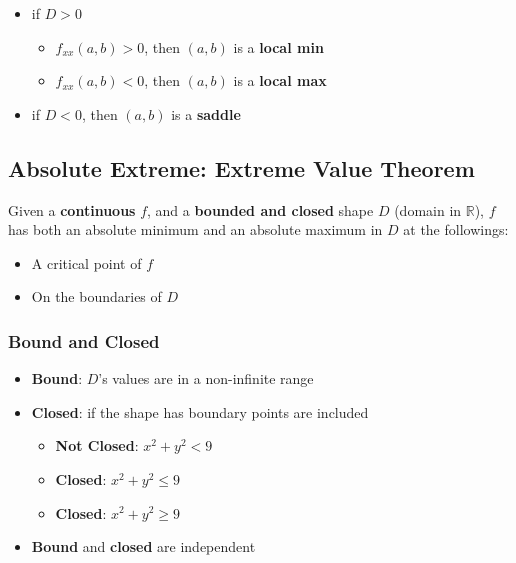    \begin{itemize}
      \item if $ D > 0 $
      \begin{itemize}
        \item $ f_{xx} (a, b) > 0 $, then $ (a, b) $ is a \textbf{local min}
        \item $ f_{xx} (a, b) < 0 $, then $ (a, b) $ is a \textbf{local max}
      \end{itemize}

      \item if $ D < 0 $, then $ (a, b) $ is a \textbf{saddle}
    \end{itemize}

  \subsection{Absolute Extreme: Extreme Value Theorem}

    Given a \textbf{continuous} $ f $, and a \textbf{bounded and closed}
    shape $ D $ (domain in $ \mathbb{R} $), $ f $ has both an absolute minimum
    and an absolute maximum in $ D $ at the followings:
    \begin{itemize}
      \item A critical point of $ f $
      \item On the boundaries of $ D $
    \end{itemize}

    \subsubsection{Bound and Closed}

      \begin{itemize}
        \item \textbf{Bound}: $ D $'s values are in a non-infinite range
        \item \textbf{Closed}: if the shape has boundary points are included
        \begin{itemize}
          \item \textbf{Not Closed}: $ x^{2} + y^{2} < 9 $
          \item \textbf{Closed}: $ x^{2} + y^{2} \le 9 $
          \item \textbf{Closed}: $ x^{2} + y^{2} \ge 9 $
        \end{itemize}

        \item \textbf{Bound} and \textbf{closed} are independent
      \end{itemize}

